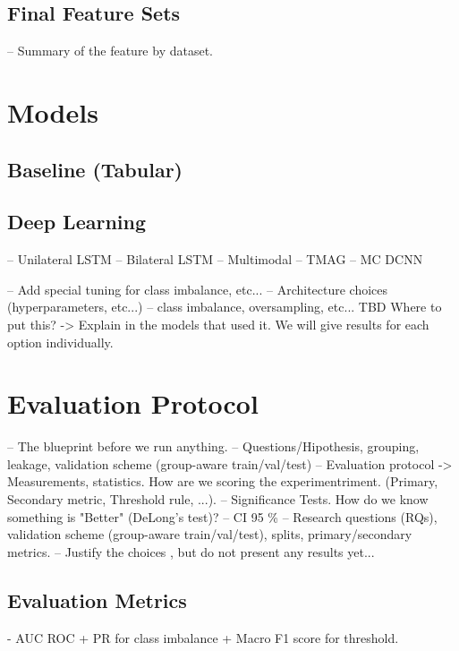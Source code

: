 
\subsection{Final Feature Sets}\label{subsec:method-final-feature-sets}
-- Summary of the feature by dataset.

\section{Models}\label{sec:method-models}
\subsection{Baseline (Tabular)}\label{subsec:method-baselines}
\subsection{Deep Learning}\label{subsec:method-deep-learning}
-- Unilateral LSTM
-- Bilateral LSTM
-- Multimodal
-- TMAG
-- MC DCNN

-- Add special tuning for class imbalance, etc...
-- Architecture choices (hyperparameters, etc...)
-- class imbalance, oversampling, etc... TBD Where to put this? -> Explain in the models that used it. We will give results for each option individually.

\section{Evaluation Protocol}\label{sec:method-evaluation-protocol}
-- The blueprint before we run anything.
-- Questions/Hipothesis, grouping, leakage, validation scheme (group-aware train/val/test)
-- Evaluation protocol -> Measurements, statistics. How are we scoring the experimentriment. (Primary, Secondary metric, Threshold rule, ...).
-- Significance Tests. How do we know something is "Better" (DeLong's test)?
-- CI 95 \%
-- Research questions (RQs), validation scheme (group-aware train/val/test), splits, primary/secondary metrics.
-- Justify the choices , but do not present any results yet...

\subsection{Evaluation Metrics}\label{subsec:method-evaluation-metrics}
- AUC ROC + PR for class imbalance + Macro F1 score for threshold.

